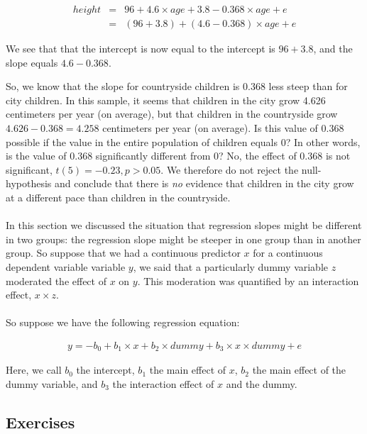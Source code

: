 \documentclass[]{report}\usepackage[]{graphicx}\usepackage[]{color}
\begin{document}
\begin{eqnarray} 
height &=& 96 + 4.6  \times age + 3.8   - 0.368  \times age + e \\ \nonumber
      &=& (96+ 3.8) + (4.6 - 0.368) \times age + e   \nonumber
 \end{eqnarray}

We see that that the intercept is now equal to the intercept is $96+ 3.8$, and the slope equals $4.6-0.368$. 

So, we know that the slope for countryside children is 0.368 less steep than for city children. In this sample, it seems that children in the city grow 4.626 centimeters per year (on average), but that children in the countryside grow $4.626-0.368= 4.258$ centimeters per year (on average). Is this value of 0.368 possible if the value in the entire population of children equals 0? In other words, is the value of 0.368 significantly different from 0? No, the effect of 0.368 is not significant, $t(5)=-0.23, p>0.05$. We therefore do not reject the null-hypothesis and conclude that there is \textit{no} evidence that children in the city grow at a different pace than children in the countryside.\\
\\
In this section we discussed the situation that regression slopes might be different in two groups: the regression slope might be steeper in one group than in another group. So suppose that we had a continuous predictor $x$ for a continuous dependent variable variable $y$, we said that a particularly dummy variable $z$ moderated the effect of $x$ on $y$. This moderation was quantified by an interaction effect, $x \times z$.
\\
\\
So suppose we have the following regression equation:


\begin{eqnarray} 
y = - b_0 + b_1  \times x + b_2  \times dummy +b_3 \times x \times dummy + e \nonumber
\end{eqnarray}

Here, we call $b_0$ the intercept, $b_1$ the main effect of $x$, $b_2$ the main effect of the dummy variable, and $b_3$ the interaction effect of $x$ and the dummy. 


\subsection{Exercises}
\end{document}
